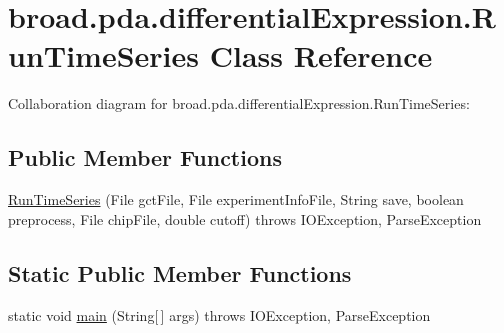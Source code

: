 \hypertarget{classbroad_1_1pda_1_1differential_expression_1_1_run_time_series}{\section{broad.\+pda.\+differential\+Expression.\+Run\+Time\+Series Class Reference}
\label{classbroad_1_1pda_1_1differential_expression_1_1_run_time_series}
}


Collaboration diagram for broad.\+pda.\+differential\+Expression.\+Run\+Time\+Series\+:
\subsection*{Public Member Functions}
\begin{DoxyCompactItemize}
\item 
\hyperlink{classbroad_1_1pda_1_1differential_expression_1_1_run_time_series_aed9a0a19adfd969abfa29765616038ed}{Run\+Time\+Series} (File gct\+File, File experiment\+Info\+File, String save, boolean preprocess, File chip\+File, double cutoff)  throws I\+O\+Exception, Parse\+Exception
\end{DoxyCompactItemize}
\subsection*{Static Public Member Functions}
\begin{DoxyCompactItemize}
\item 
static void \hyperlink{classbroad_1_1pda_1_1differential_expression_1_1_run_time_series_abe8f9d65ca420bd046ff2d25c98f1ee4}{main} (String\mbox{[}$\,$\mbox{]} args)  throws I\+O\+Exception, Parse\+Exception
\end{DoxyCompactItemize}


